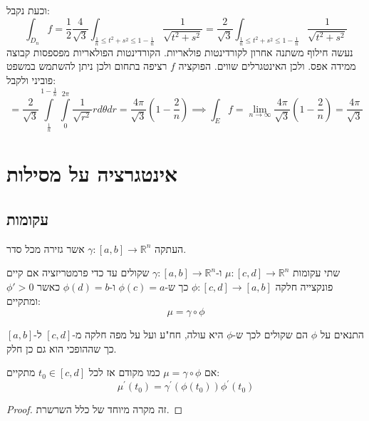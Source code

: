 \documentclass{tstextbook}
\begin{document}
וכעת נקבל:
$$\int_{D_{n}}f={\frac{1}{2}}{\frac{4}{\sqrt{3}}}\int_{{\frac{1}{n}}\leq t^{2}+s^{2}\leq1-{\frac{1}{n}}}{\frac{1}{\sqrt{t^{2}+s^{2}}}}={\frac{2}{\sqrt{3}}}\int_{{\frac{1}{n}}\leq t^{2}+s^{2}\leq1-{\frac{1}{n}}}{\frac{1}{\sqrt{t^{2}+s^{2}}}}$$
נעשה חילוף משתנה אחרון לקורדינטות פולאריות. הקורדינטות הפולאריות מפספסות קבוצה ממידה אפס. ולכן האינטגרלים שווים. הפוקציה \(f\) רציפה בתחום ולכן ניתן להשתמש במשפט פוביני ולקבל:
$$=\frac{2}{\sqrt{3}}\int\limits_{\frac{1}{n}}^{1-\frac{1}{n}}\int\limits_{0}^{2\pi}\frac{1}{\sqrt{r^{2}}}r d\theta d r=\frac{4\pi}{\sqrt{3}}\left( 1-\frac{2}{n} \right)\implies\int_{E}f=\operatorname*{lim}_{n\to\infty}{\frac{4\pi}{\sqrt{3}}}\left( 1-{\frac{2}{n}} \right)={\frac{4\pi}{\sqrt{3}}}$$

\section{אינטגרציה על מסילות}

\subsection{עקומות}

\begin{definition}
העתקה \(\gamma:[a,b]\to \mathbb{R}^{n}\) אשר גזירה מכל סדר.

\end{definition}
\begin{definition}
שתי עקומות \(\mu:[c,d]\to \mathbb{R}^{n}\) ו-\(\gamma:[a,b]\to \mathbb{R}^{n}\) שקולים עד כדי פרמטריזציה אם קיים פונקצייה חלקה \(\phi:[c,d]\to[a,b]\) כך ש-\(\phi(c)=a\) ו-\(\phi(d)=b\) כאשר \(\phi'>0\) ומתקיים:
$$\mu=\gamma \circ  \phi$$

\end{definition}
\begin{remark}
התנאים על \(\phi\) הם שקולים לכך ש-\(\phi\) היא עולה, חח"ע ועל על מפה חלקה מ-\([c,d]\) ל-\([a,b]\) כך שההופכי הוא גם כן חלק.

\end{remark}
\begin{proposition}
אם \(\mu=\gamma \circ\phi\) כמו מקודם אז לכל \(t_{0} \in [c,d]\) מתקיים:
$$\mu^{\prime}(t_{0})=\gamma^{\prime}(\phi(t_{0}))\phi^{\prime}(t_{0})$$

\end{proposition}
\begin{proof}
זה מקרה מיוחד של כלל השרשרת.

\end{proof}
\end{document}
